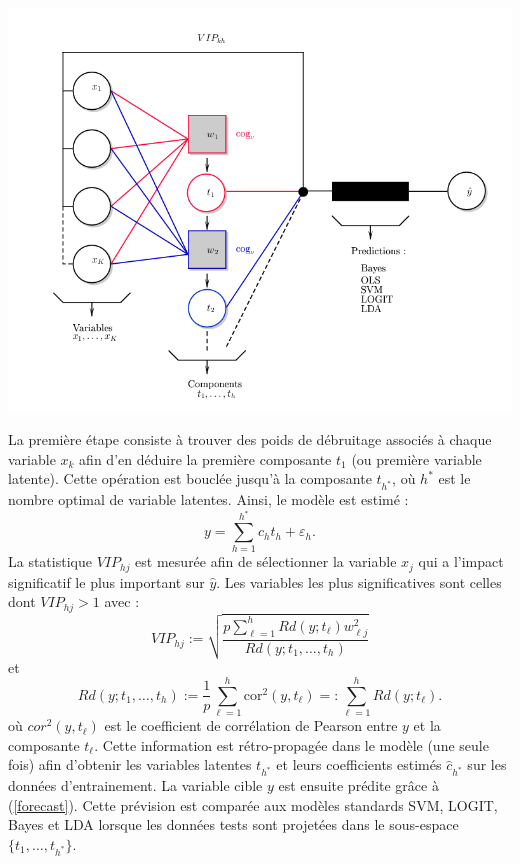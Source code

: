 \documentclass[a4paper, 12pt]{article}
\newcommand{\cor}{\text{cor}}
\newcommand{\eps}{\varepsilon}
\numberwithin{equation}{section}
\begin{document}
\begin{center}
\includegraphics[scale=0.5]{graph.png}
\end{center}


La première étape consiste à trouver des poids de débruitage associés à chaque variable $x_k$ afin d'en déduire la première composante $t_1$ (ou première variable latente). Cette opération est bouclée jusqu'à la composante $t_{h^*}$, où $h^*$ est le nombre optimal de variable latentes. Ainsi, le modèle est estimé :
\begin{equation}\label{forecast}
y=\sum_{h=1}^{h^*} c_ht_h +\eps_h.
\end{equation}   
La statistique $VIP_{hj}$ est mesurée afin de sélectionner la variable $x_j$ qui a l'impact significatif le plus important sur $\hat{y}$. Les variables les plus significatives sont celles dont $VIP_{hj}>1$ avec :
\[
VIP_{hj} := \sqrt{\frac{p\sum_{\ell=1}^{h}Rd(y;t_\ell)w_{\ell j}^2}{Rd(y;t_1,\ldots,t_h)}} 
\] 
et 
\[
Rd(y; t_1,\ldots,t_h) := \frac{1}{p}\sum_{\ell=1}^{h}\cor^2(y,t_\ell) =: \sum_{\ell=1}^{h}Rd(y;t_\ell).
\]
où $cor^2(y,t_\ell)$ est le coefficient de corrélation de Pearson entre $y$ et la composante $t_\ell$. Cette information est rétro-propagée dans le modèle (une seule fois) afin d'obtenir les variables latentes $t_{h^*}$ et leurs coefficients estimés $\hat{c}_{h^*}$ sur les données d'entrainement. La variable cible $y$ est ensuite prédite grâce à (\ref{forecast}). Cette prévision est comparée aux modèles standards SVM, LOGIT, Bayes et LDA lorsque les données tests sont projetées dans le sous-espace $\{t_1,\ldots,t_{h^*}\}$.\\
\end{document}

